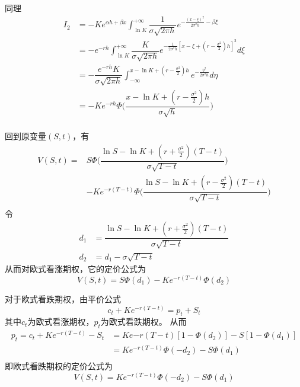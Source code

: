 \documentclass[UTF8，12pt]{ctexart}
\numberwithin{equation}{section}
\begin{document}
同理
\begin{equation}
	\begin{split}
		I_2&=-Ke^{\alpha h+\beta x}\int_{\ln K}^{+\infty}\dfrac{1}{\sigma\sqrt{2\pi h}}e^{-\frac{(x-\xi)^2}{2\sigma^2 h}-\beta\xi}\\
		&=-e^{-rh}\int_{\ln K}^{+\infty}\dfrac{K}{\sigma\sqrt{2\pi h}}e^{-\frac{1}{2\sigma^2 h}\left[x-\xi+(r-\frac{\sigma^2}{2})h\right]^2}d\xi\\
		&=-\dfrac{e^{-rh}K}{\sigma\sqrt{2\pi h}}\int_{-\infty}^{x-\ln K+(r-\frac{\sigma^2}{2})h}e^{-\frac{\eta^2}{2\sigma^2 h}}d\eta\\
		&=-Ke^{-rh}\Phi\Big(\dfrac{x-\ln K+(r-\frac{\sigma^2}{2})h}{\sigma\sqrt{h}}\Big)\\
	\end{split}
\end{equation}

回到原变量$(S,t)$，有
\begin{equation}
	\begin{split}
		V(S,t)=&S\Phi\Big(\dfrac{\ln S-\ln K+(r+\frac{\sigma^2}{2})(T-t)}{\sigma\sqrt{T-t}}\Big)\\
		       &-Ke^{-r(T-t)}\Phi\Big(\dfrac{\ln S-\ln K+(r-\frac{\sigma^2}{2})(T-t)}{\sigma\sqrt{T-t}}\Big)\\
	\end{split}
\end{equation}
令
\begin{equation}
	\begin{split}
		d_1&=\dfrac{\ln S-\ln K+(r+\frac{\sigma^2}{2})(T-t)}{\sigma\sqrt{T-t}}\\
		d_2&=d_1-\sigma\sqrt{T-t}
	\end{split}
\end{equation}
从而对欧式看涨期权，它的定价公式为
\begin{equation}
	V(S,t)=S\Phi(d_1)-Ke^{-r(T-t)}\Phi(d_2)
\end{equation}

对于欧式看跌期权，由平价公式
\begin{equation}
	c_t+Ke^{-r(T-t)}=p_t+S_t
\end{equation}
其中$c_t$为欧式看涨期权，$p_t$为欧式看跌期权。
从而
\begin{equation}
	\begin{split}
		p_t=c_t+Ke^{-r(T-t)}-S_t&=Ke{-r(T-t)}\left[1-\Phi(d_2)\right]-S\left[1-\Phi(d_1)\right]\\
		   &=Ke^{-r(T-t)}\Phi(-d_2)-S\Phi(d_1)\\
	\end{split}
\end{equation}
即欧式看跌期权的定价公式为
\begin{equation}
	V(S,t)=Ke^{-r(T-t)}\Phi(-d_2)-S\Phi(d_1)
\end{equation}
\end{document}
